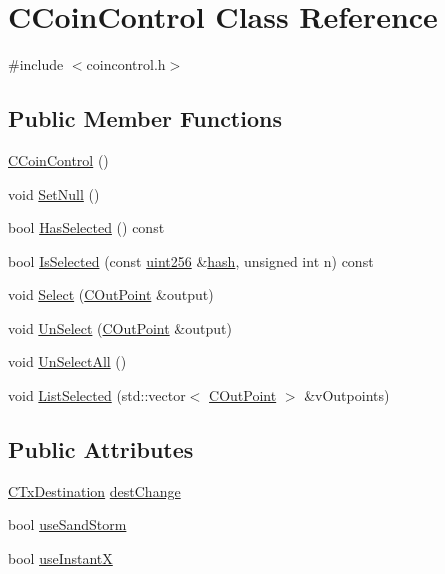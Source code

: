 \hypertarget{class_c_coin_control}{}\section{C\+Coin\+Control Class Reference}
\label{class_c_coin_control}


{\ttfamily \#include $<$coincontrol.\+h$>$}

\subsection*{Public Member Functions}
\begin{DoxyCompactItemize}
\item 
\hyperlink{class_c_coin_control_a76b6d0cfff21c4d74a4c4aebfc7f697d}{C\+Coin\+Control} ()
\item 
void \hyperlink{class_c_coin_control_aadca0a9e82e1e6d84dff4649e1d29d31}{Set\+Null} ()
\item 
bool \hyperlink{class_c_coin_control_a8c8b06e183e7a30c646bdec793b30e89}{Has\+Selected} () const 
\item 
bool \hyperlink{class_c_coin_control_a8cbb071e0eb4ff34ba0209b3708c8142}{Is\+Selected} (const \hyperlink{classuint256}{uint256} \&\hyperlink{cache_8cc_a11ecb029164e055f28f4123ce3748862}{hash}, unsigned int n) const 
\item 
void \hyperlink{class_c_coin_control_a0c6d66b747f1e9531afa32a8bb851ba0}{Select} (\hyperlink{class_c_out_point}{C\+Out\+Point} \&output)
\item 
void \hyperlink{class_c_coin_control_a28843122428b30c81814e54b9a0bcaa6}{Un\+Select} (\hyperlink{class_c_out_point}{C\+Out\+Point} \&output)
\item 
void \hyperlink{class_c_coin_control_a78bc21b1698e6ae5e6c2fef9758db39c}{Un\+Select\+All} ()
\item 
void \hyperlink{class_c_coin_control_a176b3a32b5f623fe25b8e61ca561422e}{List\+Selected} (std\+::vector$<$ \hyperlink{class_c_out_point}{C\+Out\+Point} $>$ \&v\+Outpoints)
\end{DoxyCompactItemize}
\subsection*{Public Attributes}
\begin{DoxyCompactItemize}
\item 
\hyperlink{keystore_8h_a8f46ecba0ddeb036be6b58d6ed1909cd}{C\+Tx\+Destination} \hyperlink{class_c_coin_control_aa991ffd830267f6c2103fa7e03213f41}{dest\+Change}
\item 
bool \hyperlink{class_c_coin_control_aaf970313b382dbd5ac0076c7765949b7}{use\+Sand\+Storm}
\item 
bool \hyperlink{class_c_coin_control_a8c5a07b8f3acef82a471a57a7f21e170}{use\+Instant\+X}
\end{DoxyCompactItemize}


